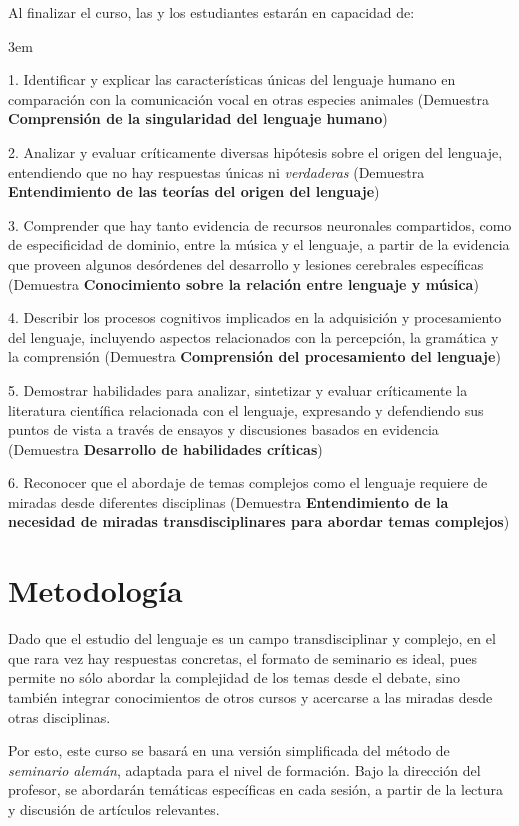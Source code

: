 \documentclass[11pt,a4paper,]{awesome-cv}
\begin{document}
\begin{footnotesize}

Al finalizar el curso, las y los estudiantes estarán en capacidad de:

\par
\begingroup
\leftskip3em
\rightskip\leftskip

1. Identificar y explicar las características únicas del lenguaje humano en comparación con la comunicación vocal en otras especies animales (Demuestra \textbf{Comprensión de la singularidad del lenguaje humano})

2. Analizar y evaluar críticamente diversas hipótesis sobre el origen del lenguaje, entendiendo que no hay respuestas únicas ni \textit{verdaderas} (Demuestra \textbf{Entendimiento de las teorías del origen del lenguaje})

3. Comprender que hay tanto evidencia de recursos neuronales compartidos, como de especificidad de dominio, entre la música y el lenguaje, a partir de la evidencia que proveen algunos desórdenes del desarrollo y lesiones cerebrales específicas (Demuestra \textbf{Conocimiento sobre la relación entre lenguaje y música})

4. Describir los procesos cognitivos implicados en la adquisición y procesamiento del lenguaje, incluyendo aspectos relacionados con la percepción, la gramática y la comprensión (Demuestra \textbf{Comprensión del procesamiento del lenguaje})

5. Demostrar habilidades para analizar, sintetizar y evaluar críticamente la literatura científica relacionada con el lenguaje, expresando y defendiendo sus puntos de vista a través de ensayos y discusiones basados en evidencia (Demuestra \textbf{Desarrollo de habilidades críticas})

6. Reconocer que el abordaje de temas complejos como el lenguaje requiere de miradas desde diferentes disciplinas (Demuestra \textbf{Entendimiento de la necesidad de miradas transdisciplinares para abordar temas complejos})

\par
\endgroup

\end{footnotesize}

\hypertarget{metodologuxeda}{%
\section{Metodología}\label{metodologuxeda}}

\begin{footnotesize}
Dado que el estudio del lenguaje es un campo transdisciplinar y complejo, en el que rara vez hay respuestas concretas, el formato de seminario es ideal, pues permite no sólo abordar la complejidad de los temas desde el debate, sino también integrar conocimientos de otros cursos y acercarse a las miradas desde otras disciplinas. 

Por esto, este curso se basará en una versión simplificada del método de \textit{seminario alemán}, adaptada para el nivel de formación. Bajo la dirección del profesor, se abordarán temáticas específicas en cada sesión, a partir de la lectura y discusión de artículos relevantes. 
\end{footnotesize}
\end{document}

